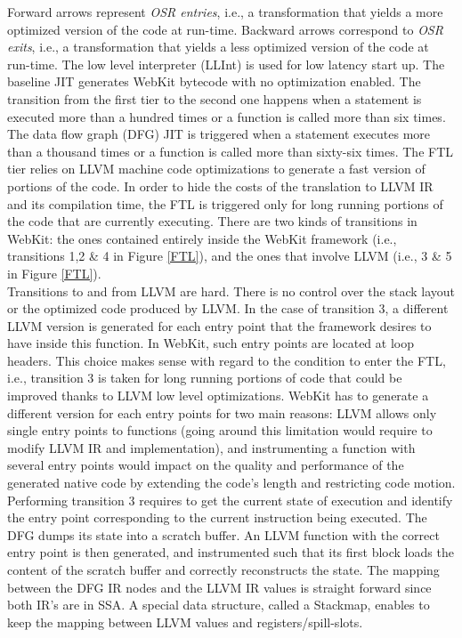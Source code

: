 Forward arrows represent \textit{OSR entries}, i.e., a transformation that yields a more optimized version of the code at run-time.
Backward arrows correspond to \textit{OSR exits}, i.e., a transformation that yields a less optimized version of the code at run-time.
The low level interpreter (LLInt) is used for low latency start up.
The baseline JIT generates WebKit bytecode with no optimization enabled.
The transition from the first tier to the second one happens when a statement is executed more than a hundred times or a function is called more than six times.
The data flow graph (DFG) JIT is triggered when a statement executes more than a thousand times or a function is called more than sixty-six times.
The FTL tier relies on LLVM machine code optimizations to generate a fast version of portions of the code.
In order to hide the costs of the translation to LLVM IR and its compilation time, the FTL is triggered only for long running portions of the code that are currently executing.
There are two kinds of transitions in WebKit: the ones contained entirely inside the WebKit framework (i.e., transitions 1,2 \& 4 in Figure \ref{FTL}), and the ones that involve LLVM (i.e., 3 \& 5 in Figure \ref{FTL}).\\

Transitions to and from LLVM are hard. 
There is no control over the stack layout or the optimized code produced by LLVM.
In the case of transition 3, a different LLVM version is generated for each entry point that the framework desires to have inside this function.
In WebKit, such entry points are located at loop headers. 
This choice makes sense with regard to the condition to enter the FTL, i.e., transition 3 is taken for long running portions of code that could be improved thanks to LLVM low level optimizations.
WebKit has to generate a different version for each entry points for two main reasons: LLVM allows only single entry points to functions (going around this limitation would require to modify LLVM IR and implementation), and instrumenting a function with several entry points would impact on the quality and performance of the generated native code by extending the code's length and restricting code motion.\\

Performing transition 3 requires to get the current state of execution and identify the entry point corresponding to the current instruction being executed.
The DFG dumps its state into a scratch buffer.
An LLVM function with the correct entry point is then generated, and instrumented such that its first block loads the content of the scratch buffer and correctly reconstructs the state.
The mapping between the DFG IR nodes and the LLVM IR values is straight forward since both IR's are in SSA.
A special data structure, called a Stackmap, enables to keep the mapping between LLVM values and registers/spill-slots.\\

